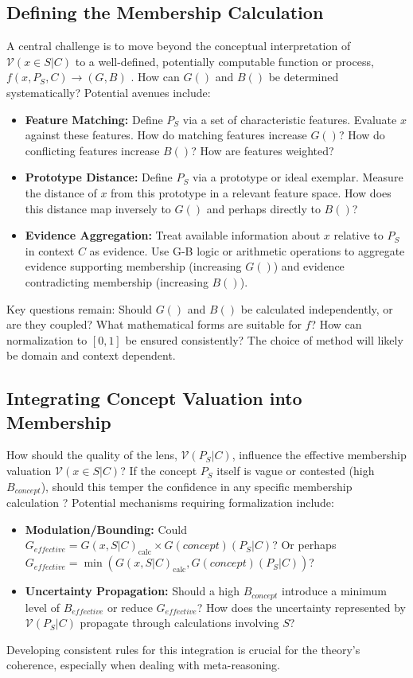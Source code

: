\documentclass[11pt]{article}
\newcommand{\gbval}[1]{\mathcal{V}(#1)}         %
\newcommand{\gcomp}[1]{G(#1)}                   %
\newcommand{\bcomp}[1]{B(#1)}                   %
\newcommand{\pset}[1]{P_{#1}}                   %
\theoremstyle{definition}
\theoremstyle{plain}
\begin{document}
\subsection{Defining the Membership Calculation} \label{sec:membership_calc}
A central challenge is to move beyond the conceptual interpretation of $\gbval{x \in S | C}$ to a well-defined, potentially computable function or process, $f(x, \pset{S}, C) \rightarrow (G, B)$ \cite{gb_set_theory_outline}. How can $\gcomp{}$ and $\bcomp{}$ be determined systematically? Potential avenues include:
\begin{itemize}
    \item \textbf{Feature Matching:} Define $\pset{S}$ via a set of characteristic features. Evaluate $x$ against these features. How do matching features increase $\gcomp{}$? How do conflicting features increase $\bcomp{}$? How are features weighted?
    \item \textbf{Prototype Distance:} Define $\pset{S}$ via a prototype or ideal exemplar. Measure the distance of $x$ from this prototype in a relevant feature space. How does this distance map inversely to $\gcomp{}$ and perhaps directly to $\bcomp{}$?
    \item \textbf{Evidence Aggregation:} Treat available information about $x$ relative to $\pset{S}$ in context $C$ as evidence. Use G-B logic or arithmetic operations to aggregate evidence supporting membership (increasing $\gcomp{}$) and evidence contradicting membership (increasing $\bcomp{}$).
\end{itemize}
Key questions remain: Should $\gcomp{}$ and $\bcomp{}$ be calculated independently, or are they coupled? What mathematical forms are suitable for $f$? How can normalization to $[0, 1]$ be ensured consistently? The choice of method will likely be domain and context dependent.

\subsection{Integrating Concept Valuation into Membership} \label{sec:integrate_concept_val}
How should the quality of the lens, $\gbval{\pset{S}|C}$, influence the effective membership valuation $\gbval{x \in S | C}$? If the concept $\pset{S}$ itself is vague or contested (high $B_{concept}$), should this temper the confidence in any specific membership calculation \cite{gb_set_theory_outline}? Potential mechanisms requiring formalization include:
\begin{itemize}
    \item \textbf{Modulation/Bounding:} Could $G_{effective} = \gcomp{x, S|C}_{\text{calc}} \times \gcomp{concept}(\pset{S}|C)$? Or perhaps $G_{effective} = \min(\gcomp{x, S|C}_{\text{calc}}, \gcomp{concept}(\pset{S}|C))$?
    \item \textbf{Uncertainty Propagation:} Should a high $B_{concept}$ introduce a minimum level of $B_{effective}$ or reduce $G_{effective}$? How does the uncertainty represented by $\gbval{\pset{S}|C}$ propagate through calculations involving $S$?
\end{itemize}
Developing consistent rules for this integration is crucial for the theory's coherence, especially when dealing with meta-reasoning.
\end{document}
